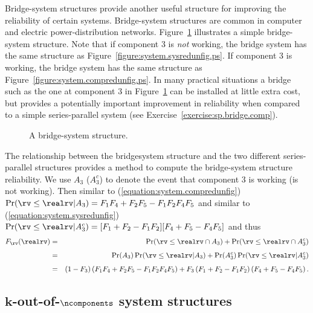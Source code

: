 Bridge-system structures provide another useful structure for
improving the reliability of certain systems. Bridge-system structures are
common in computer and electric power-distribution networks.
Figure~\ref{figure:system.bridgefig.ps} illustrates a simple
bridge-system structure. Note that if component 3 is {\em not}
working, the bridge system has the same structure as
Figure~\ref{figure:system.sysredunfig.ps}.  If component 3 is working,
the bridge system has the same structure as
Figure~\ref{figure:system.compredunfig.ps}.  In many practical
situations a bridge such as the one at component 3 in
Figure~\ref{figure:system.bridgefig.ps} can be installed at little
extra cost, but provides a potentially important improvement in
reliability when compared to a simple series-parallel system (see
Exercise~\ref{exercise:sp.bridge.comp}).
\begin{figure}
\caption{A bridge-system structure.}
\label{figure:system.bridgefig.ps}
\end{figure}

The relationship between the bridgesystem structure and the two different
series-parallel structures provides a method to compute the
bridge-system structure reliability.  We use $A_{3}$ ($A_{3}^{c}$)
to denote the event that component $3$ is working (is not working).
Then similar to (\ref{equation:system.compredunfig}) $\Pr( \rv \le
\realrv | A_{3})= F_{1} F_{4} + F_{2} F_{5} - F_{1} F_{2}
F_{4} F_{5}$ and similar to (\ref{equation:system.sysredunfig})
$\Pr(\rv \le
\realrv | A_{3}^{c})= [F_{1} + F_{2} - F_{1} F_{2} ] [F_{4} +
F_{5} - F_{4} F_{5} ] $ and thus
\begin{eqnarray*}
F_{\rv}(\realrv)&=& 
\Pr( \rv \le \realrv \cap A_{3})
+
\Pr(\rv \le \realrv \cap A_{3}^{c})
\\[1ex]
&=&
\Pr(A_{3}) \Pr( \rv \le \realrv | A_{3}) 
+
\Pr(A_{3}^{c}) \Pr(\rv \le \realrv | A_{3}^{c}) 
\\[1ex]
&=&
(1-F_{3}) \left (
F_{1}F_{4}+ F_{2}F_{5}
-
F_{1}F_{2}F_{4}F_{5}
          \right )
+
F_{3}     \left (
F_{1}+F_{2}-F_{1}F_{2}
          \right )
          \left (
F_{4}+F_{5}- F_{4}F_{5}
          \right ).
\end{eqnarray*}

\subsection{$\boldsymbol{k}$-out-of-$\boldsymbol{\ncomponents}$ 
\label{section:k.of.n}
system structures}

